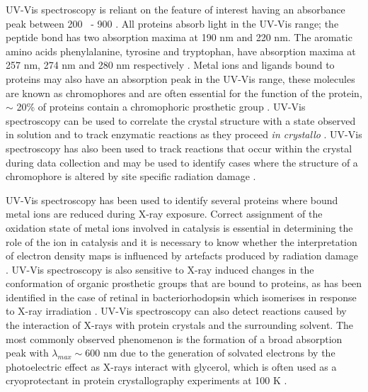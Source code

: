 UV-Vis spectroscopy is reliant on the feature of interest having an absorbance peak between 200 \nm ~- 900 \nm. All proteins absorb light in the UV-Vis range; the peptide bond has two absorption maxima at 190 nm and 220 nm. The aromatic amino acids phenylalanine, tyrosine and tryptophan, have absorption maxima at 257 nm, 274 nm and 280 nm respectively \cite{Wilson2005}. Metal ions and ligands bound to proteins may also have an absorption peak in the UV-Vis range, these molecules are known as chromophores and are often essential for the function of the protein, $\sim$ 20\% of proteins contain a chromophoric prosthetic group \cite{Dworkowski2015}. UV-Vis spectroscopy can be used to correlate the crystal structure with a state observed in solution and to track enzymatic reactions as they proceed \textit{in crystallo} \cite{Ronda2015}. UV-Vis spectroscopy has also been used to track reactions that occur within the crystal during data collection and may be used to identify cases where the structure of a chromophore is altered by site specific radiation damage \cite{Pearson2009}. 

UV-Vis spectroscopy has been used to identify several proteins where bound metal ions are reduced during X-ray exposure. Correct assignment of the oxidation state of metal ions involved in catalysis is essential in determining the role of the ion in catalysis and it is necessary to know whether the interpretation of electron density maps is influenced by artefacts produced by radiation damage \cite{Antonyuk2011}. UV-Vis spectroscopy is also sensitive to X-ray induced changes in the conformation of organic prosthetic groups that are bound to proteins, as has been identified in the case of retinal in bacteriorhodopsin which isomerises in response to X-ray irradiation \cite{Borshchevskiy2011,Borshchevskiy2014}. UV-Vis spectroscopy can also detect reactions caused by the interaction of X-rays with protein crystals and the surrounding solvent. The most commonly observed phenomenon is the formation of a broad absorption peak with $\lambda_{max} \sim$600 nm due to the generation of solvated electrons by the photoelectric effect as X-rays interact with glycerol, which is often used as a cryoprotectant in protein crystallography experiments at 100 K \cite{McGeehan2009,Owen2012}.

